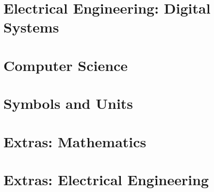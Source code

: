 \documentclass{article}
\begin{document}
\newpage
\section{Electrical Engineering: Digital Systems}
\label{sec:ee-digital}

    {  }

\newpage
\section{Computer Science}
\label{sec:compsci}

    {  }

\newpage
\section{Symbols and Units}
\label{sec:units}

    {  }

\newpage
{}

\section{Extras: Mathematics}%
\label{sec:extrasec-math}

    {  }

\newpage
\section{Extras: Electrical Engineering}%
\label{sec:extrasec-ee}

    {  }
\end{document}

